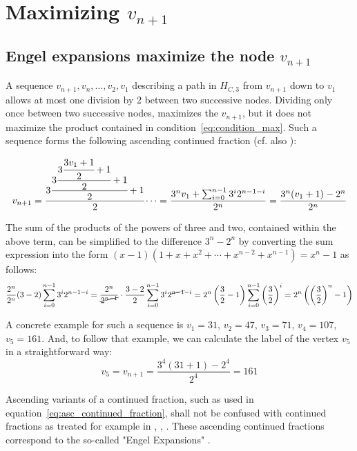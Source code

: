 \chapter{Maximizing \mbox{\boldmath$v_{n+1}$}}
\label{ch:maximizing_target_node}

\section{Engel expansions maximize the node $v_{n+1}$}
A sequence $v_{n+1},v_n,\ldots,v_2,v_1$ describing a path in $H_{C,3}$ from $v_{n+1}$ down to $v_1$ allows at most one division by $2$ between two successive nodes. Dividing only once between two successive nodes, maximizes the $v_{n+1}$, but it does not maximize the product contained in condition~\ref{eq:condition_max}. Such a sequence forms the following ascending continued fraction (cf. also \cite[p.~11]{Ref_Laarhoven}):

\begin{equation}
\label{eq:asc_continued_fraction}
v_{n+1}=\cfrac{3\cfrac{3\cfrac{3\cfrac{3v_1+1}{2}+1}{2}+1}{2}+1}{2}\dotsb
=\frac{3^nv_1+\sum_{i=0}^{n-1}3^i2^{n-1-i}}{2^n}
=\frac{3^n(v_1+1)-2^n}{2^n}
\end{equation}

\par\medskip
The sum of the products of the powers of three and two, contained within the above term, can be simplified to the difference $3^n-2^n$ by converting the sum expression into the form $(x-1)(1+x+x^2+\cdots+x^{n-2}+x^{n-1})=x^n-1$ as follows:
\[
\frac{2^n}{2^n}(3-2)\sum_{i=0}^{n-1}3^i2^{n-1-i}
=\frac{2^n}{\cancel{2^{n-1}}}\cdot\frac{3-2}{2}\sum_{i=0}^{n-1}3^i2^{\cancel{n-1}-i}
=2^n\left(\frac{3}{2}-1\right)\sum_{i=0}^{n-1}\left(\frac{3}{2}\right)^i
=2^n\left(\left(\frac{3}{2}\right)^n-1\right)
\]

\begin{example}
	A concrete example for such a sequence is $v_1=31$, $v_2=47$, $v_3=71$, $v_4=107$, $v_5=161$. And, to follow that example, we can calculate the label of the vertex $v_5$ in a straightforward way:
	\[
	v_5=v_{n+1}=\frac{3^4(31+1)-2^4}{2^4}=161
	\]
\end{example}

\begin{remark}
	Ascending variants of a continued fraction, such as used in equation~\ref{eq:asc_continued_fraction}, shall not be confused with continued fractions as treated for example in \cite{Ref_Moore}, \cite{Ref_Hensley}, \cite{Ref_Borwe_etal}. These ascending continued fractions correspond to the so-called "Engel Expansions" \cite{Ref_Kraaikamp_Wu}.
\end{remark}

